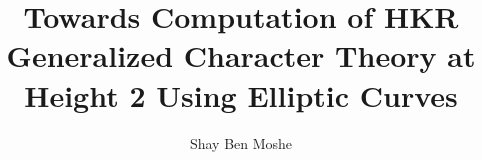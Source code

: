 \documentclass[11pt]{article}
\title{Towards Computation of HKR Generalized Character Theory at Height 2 Using Elliptic Curves}
\author{Shay Ben Moshe}
\numberwithin{equation}{subsection}
\theoremstyle{definition}
\theoremstyle{remark}
\begin{document}
	\maketitle
	
	\tableofcontents
	
	
	
	
	
	
	
	{}
	
\end{document}
